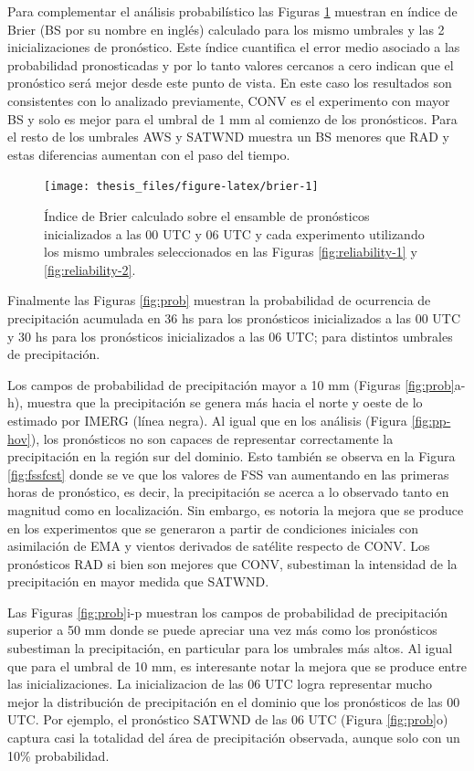 \documentclass[12pt,oneside,a4paper]{reedthesis}
\begin{document}
Para complementar el análisis probabilístico las Figuras \ref{fig:brier} muestran en índice de Brier (BS por su nombre en inglés) calculado para los mismo umbrales y las 2 inicializaciones de pronóstico. Este índice cuantifica el error medio asociado a las probabilidad pronosticadas y por lo tanto valores cercanos a cero indican que el pronóstico será mejor desde este punto de vista. En este caso los resultados son consistentes con lo analizado previamente, CONV es el experimento con mayor BS y solo es mejor para el umbral de 1 mm al comienzo de los pronósticos. Para el resto de los umbrales AWS y SATWND muestra un BS menores que RAD y estas diferencias aumentan con el paso del tiempo.


\begin{figure}

\texttt{[image: thesis\_files/figure-latex/brier-1]} \hfill{}

\caption{Índice de Brier calculado sobre el ensamble de pronósticos inicializados a las 00 UTC y 06 UTC y cada experimento utilizando los mismo umbrales seleccionados en las Figuras \ref{fig:reliability-1} y \ref{fig:reliability-2}.}\label{fig:brier}
\end{figure}
Finalmente las Figuras \ref{fig:prob} muestran la probabilidad de ocurrencia de precipitación acumulada en 36 hs para los pronósticos inicializados a las 00 UTC y 30 hs para los pronósticos inicializados a las 06 UTC; para distintos umbrales de precipitación.

Los campos de probabilidad de precipitación mayor a 10 mm (Figuras \ref{fig:prob}a-h), muestra que la precipitación se genera más hacia el norte y oeste de lo estimado por IMERG (línea negra). Al igual que en los análisis (Figura \ref{fig:pp-hov}), los pronósticos no son capaces de representar correctamente la precipitación en la región sur del dominio. Esto también se observa en la Figura \ref{fig:fssfcst} donde se ve que los valores de FSS van aumentando en las primeras horas de pronóstico, es decir, la precipitación se acerca a lo observado tanto en magnitud como en localización. Sin embargo, es notoria la mejora que se produce en los experimentos que se generaron a partir de condiciones iniciales con asimilación de EMA y vientos derivados de satélite respecto de CONV. Los pronósticos RAD si bien son mejores que CONV, subestiman la intensidad de la precipitación en mayor medida que SATWND.

Las Figuras \ref{fig:prob}i-p muestran los campos de probabilidad de precipitación superior a 50 mm donde se puede apreciar una vez más como los pronósticos subestiman la precipitación, en particular para los umbrales más altos. Al igual que para el umbral de 10 mm, es interesante notar la mejora que se produce entre las inicializaciones. La inicializacion de las 06 UTC logra representar mucho mejor la distribución de precipitación en el dominio que los pronósticos de las 00 UTC. Por ejemplo, el pronóstico SATWND de las 06 UTC (Figura \ref{fig:prob}o) captura casi la totalidad del área de precipitación observada, aunque solo con un 10\% probabilidad.
\end{document}

